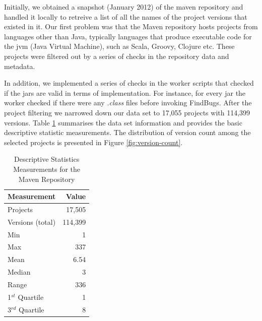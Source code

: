 \documentclass[conference]{IEEEtran}
\begin{document}
Initially, we obtained a snapshot (January 2012) of the maven repository and
handled it locally to retreive a list of all the names of the project versions
that existed in it. Our first problem was that the Maven repository
hosts projects from languages other than Java, typically languages that produce
executable code for the {\sc jvm} (Java Virtual Machine), such as Scala, Groovy,
Clojure etc. These projects were filtered out by a series of checks in
the repository data and metadata.

In addition, we implemented a series of checks in the worker scripts that
checked if the {\sc jar}s are valid in terms of implementation. For instance,
for every {\sc jar} the worker checked if there were any {\it .class} files
before invoking FindBugs. After the project filtering we narrowed down
our data set to 17,055 projects with 114,399 versions.
Table \ref{tbl:repository} summarises the data set information and
provides the basic descriptive statistic measurements. The distribution of version
count among the selected projects is presented in Figure \ref{fig:version-count}.

\begin{table}
\centering
\caption{Descriptive Statistics Measurements for the Maven Repository}
\label{tbl:repository}
\begin{tabular}{l r}
\hline
Measurement & Value\\
 \hline
Projects & 17,505\\
Versions (total) & 114,399\\
Min & 1\\
Max & 337\\
Mean & 6.54\\
Median & 3\\
Range & 336\\
1$^{st}$ Quartile & 1\\
3$^{rd}$ Quartile & 8\\
\hline
\end{tabular}
\end{table}
\end{document}

